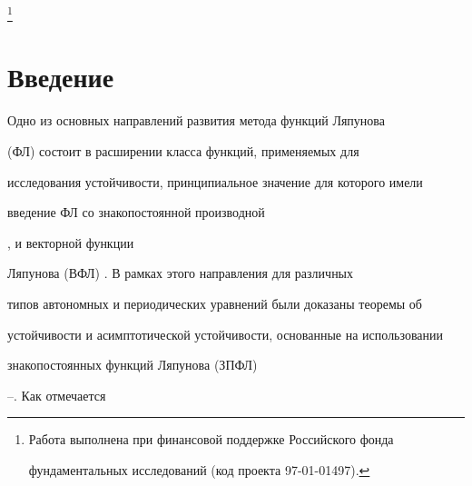  


\thanks{Работа выполнена при финансовой поддержке Российского фонда 


фундаментальных исследований (код проекта 97-01-01497).} 


\date{} 




 


\pagestyle{plain} %


 


 




 


\maketitle 


 




 


 


\section{Введение} 


 


Одно из основных направлений развития метода функций Ляпунова 


(ФЛ) \cite{Lya} состоит в расширении класса функций, применяемых для 


исследования устойчивости, принципиальное значение для которого имели 


введение ФЛ со знакопостоянной производной 


\cite{Bar}, \cite{Kra} и векторной функции 


Ляпунова (ВФЛ) \cite{M1}. В рамках этого направления для различных 


типов автономных и периодических уравнений были доказаны теоремы об 


устойчивости и асимптотической устойчивости, основанные на использовании 


знакопостоянных функций Ляпунова (ЗПФЛ) 


\cite{Sam}--\cite{Bul2}. Как отмечается 



